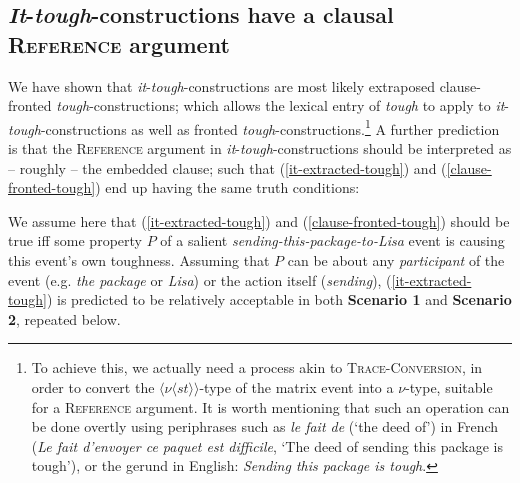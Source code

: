 \documentclass[11pt]{article}
\begin{document}
\subsection{\textit{It}-\textit{tough}-constructions have a clausal \textsc{Reference} argument}
	 We have shown that \textit{it}-\textit{tough}-constructions are most likely extraposed clause-fronted \textit{tough}-constructions; which allows the lexical entry of \textit{tough} to apply to \textit{it}-\textit{tough}-constructions as well as fronted \textit{tough}-constructions.\footnote{To achieve this, we actually need a process akin to \textsc{Trace-Conversion}, in order to convert the $\langle \nu \langle s t \rangle \rangle$-type of the matrix event into a $\nu$-type, suitable for a \textsc{Reference} argument. It is worth mentioning that such an operation can be done overtly using periphrases such as \textit{le fait de} (`the deed of') in French (\textit{Le fait d'envoyer ce paquet est difficile}, `The deed of sending this package is tough'), or the gerund in English: \textit{Sending this package is tough}.}
	 A further prediction is that the \textsc{Reference} argument in \textit{it}-\textit{tough}-constructions should be interpreted as -- roughly -- the embedded clause; such that  (\ref{it-extracted-tough}) and (\ref{clause-fronted-tough}) end up having the same truth conditions:
	\begin{exe}
		\ex 
		\begin{xlist}
			\label{it-extracted-tough}
			\label{clause-fronted-tough}
		\end{xlist}
	\end{exe}
	 We assume here that (\ref{it-extracted-tough}) and (\ref{clause-fronted-tough}) should be true iff some property $P$ of a salient \textit{sending-this-package-to-Lisa} event is causing this event's own toughness. Assuming that $P$ can be about any \textit{participant} of the event (e.g. \textit{the package} or \textit{Lisa}) or the action itself (\textit{sending}), (\ref{it-extracted-tough}) is predicted to be relatively acceptable in both \textbf{Scenario 1} and \textbf{Scenario 2}, repeated below.
	 \begin{center}
	 \end{center}
	 \begin{center}
	 \end{center}
 	
\end{document}
